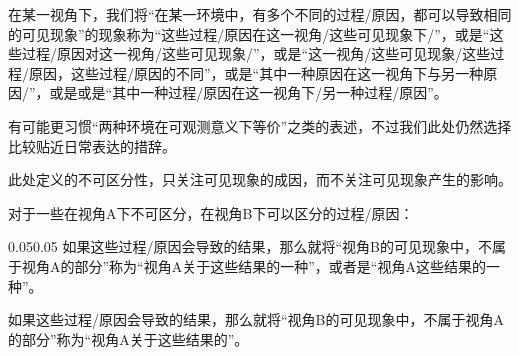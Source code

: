 在某一视角下，我们将“在某一环境中，有多个不同的过程/原因，都可以导致相同的可见现象”的现象称为“这些过程/原因在这一视角/这些可见现象下/”，或是“这些过程/原因对这一视角/这些可见现象/”，或是“这一视角/这些可见现象/这些过程/原因，这些过程/原因的不同”，或是“其中一种原因在这一视角下与另一种原因/”，或是或是“其中一种过程/原因在这一视角下/另一种过程/原因”。
\begin{explain}
\trained 有可能更习惯“两种环境在可观测意义下等价”之类的表述，不过我们此处仍然选择比较贴近日常表达的措辞。

此处定义的不可区分性，只关注可见现象的成因，而不关注可见现象产生的影响。
\end{explain}
对于一些在视角A下不可区分，在视角B下可以区分的过程/原因：
\begin{adjustwidth}{0.05\linewidth}{0.05\linewidth}
\hspace*{2em}如果这些过程/原因会导致的结果，那么就将“视角B的可见现象中，不属于视角A的部分”称为“视角A关于这些结果的一种”，或者是“视角A这些结果的一种”。

如果这些过程/原因会导致的结果，那么就将“视角B的可见现象中，不属于视角A的部分”称为“视角A关于这些结果的”。
\end{adjustwidth}
\vspace{-1.0em}
